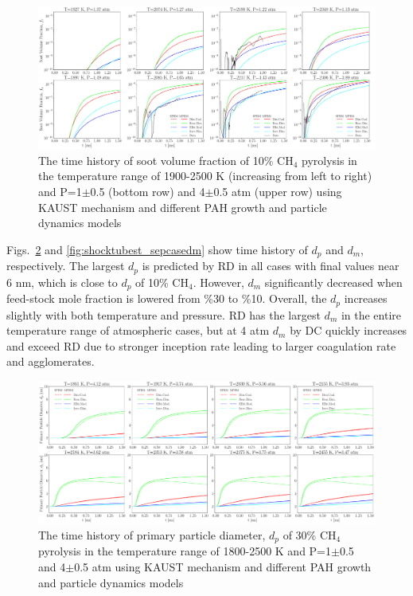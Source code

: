 \begin{figure}[H]
	\centering
	\includegraphics[width=1\textwidth]{Figures/Results/Shocktube/Stanford/September/stsh_cases_vf.pdf}
	\caption{The time history of soot volume fraction of 10\% $\mathrm{CH_4}$ pyrolysis in the temperature range of 1900-2500 K (increasing from left to right) and P=1$\pm$0.5 (bottom row) and 4$\pm$0.5 atm (upper row) using KAUST mechanism and different PAH growth and particle dynamics models}
	\label{fig:shocktubest_sepcasevf} 
\end{figure}

Figs.~\ref{fig:shocktubest_sepcasedp} and \ref{fig:shocktubest_sepcasedm} show time history of $d_p$ and $d_m$, respectively. The largest $d_p$ is predicted by RD in all cases with final values near 6 nm, which is close to $d_p$ of 10\% $\mathrm{CH_4}$. However, $d_m$ significantly decreased when feed-stock mole fraction is lowered from \%30 to \%10. Overall, the $d_p$ increases slightly with both temperature and pressure. RD has the largest $d_m$ in the entire temperature range of atmospheric cases, but at 4 atm $d_m$ by DC quickly increases and exceed RD due to stronger inception rate leading to larger coagulation rate and agglomerates. 

\begin{figure}[H]
	\centering
	\includegraphics[width=1\textwidth]{Figures/Results/Shocktube/Stanford/june/stsh_cases_dp.pdf}
	\caption{The time history of primary particle diameter, $d_p$ of 30\% $\mathrm{CH_4}$ pyrolysis in the temperature range of 1800-2500 K and P=1$\pm$0.5 and 4$\pm$0.5 atm using KAUST mechanism and different PAH growth and particle dynamics models}
	\label{fig:shocktubest_sepcasedp} 
\end{figure}

